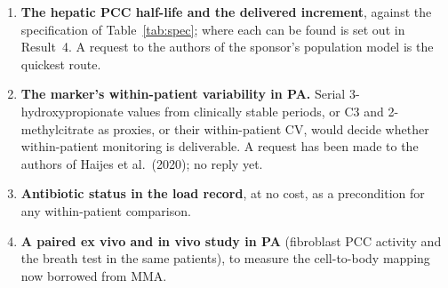 \documentclass[11pt,a4paper]{article}
\begin{document}
\begin{enumerate}
\item \textbf{The hepatic PCC half-life and the delivered increment}, against the
specification of Table~\ref{tab:spec}; where each can be found is set out in Result~4. A
request to the authors of the sponsor's population model is the quickest route.
\item \textbf{The marker's within-patient variability in PA.} Serial 3-hydroxypropionate
values from clinically stable periods, or C3 and 2-methylcitrate as proxies, or their
within-patient CV, would decide whether within-patient monitoring is deliverable. A request
has been made to the authors of Haijes et al.\ (2020); no reply yet.
\item \textbf{Antibiotic status in the load record}, at no cost, as a precondition for any
within-patient comparison.
\item \textbf{A paired ex vivo and in vivo study in PA} (fibroblast PCC activity and the
breath test in the same patients), to measure the cell-to-body mapping now borrowed from MMA.
\end{enumerate}
\end{document}
